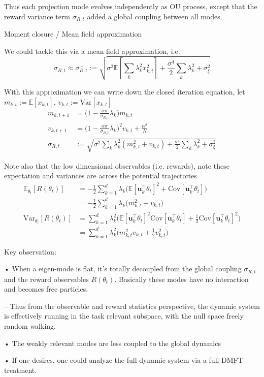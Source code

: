 Thus each projection mode evolves independently as OU process, except that the reward variance term $\sigma_{R,t}$ added a global coupling between all modes.

Moment closure / Mean field approximation

We could tackle this via a mean field approximation, i.e.
\begin{equation}
\sigma_{R,t}\approx\bar{\sigma_{R,t}}:=\sqrt{\sigma^{2}\mathbb{E}[\sum_{k}\lambda_{k}^{2}x_{k,t}^{2}]+\frac{\sigma^{4}}{2}\sum_{k}\lambda_{k}^{2}+\sigma_{\xi}^{2}}
\end{equation}

With this approximation we can write down the closed iteration equation, let $m_{k,t}:=\mathbb{E}[x_{k,t}]$, $v_{k,t}:=\mathrm{Var}[x_{k,t}]$
\begin{align}
m_{k,t+1}	&=\big(1-\frac{\alpha\sigma}{\bar{\sigma}_{R,t}}\lambda_{k}\big)m_{k,t} \\
v_{k,t+1}	&=\big(1-\frac{\alpha\sigma}{\bar{\sigma}_{R,t}}\lambda_{k}\big)^{2}v_{k,t}+\frac{\alpha^{2}}{N} \\
\bar{\sigma}_{R,t}	&:=\sqrt{\sigma^{2}\sum_{k}\lambda_{k}^{2}(m_{k,t}^{2}+v_{k,t})+\frac{\sigma^{4}}{2}\sum_{k}\lambda_{k}^{2}+\sigma_{\xi}^{2}}
\end{align}

Note also that the low dimensional observables (i.e. rewards), note these expectation and variances are across the potential trajectories
\begin{align}
\mathbb{E}_{\theta_{t}}[R(\theta_{t})]	&=-\frac{1}{2}\sum_{k=1}^{d}\lambda_{k}\Big(\mathbb{E}[\mathbf{u}_{k}^{\top}\theta_{t}]^{2}+\mathrm{Cov}[\mathbf{u}_{k}^{\top}\theta_{t}]\Big) \\
	&=-\frac{1}{2}\sum_{k=1}^{d}\lambda_{k}\Big(m_{k,t}^{2}+v_{k,t}\Big) \\
\mathrm{Var}_{\theta_{t}}[R(\theta_{t})]	&=\sum_{k=1}^{d}\lambda_{k}^{2}\Big(\mathbb{E}[\mathbf{u}_{k}^{\top}\theta_{t}]^{2}\mathrm{Cov}[\mathbf{u}_{k}^{\top}\theta_{t}]+\frac{1}{2}\mathrm{Cov}[\mathbf{u}_{k}^{\top}\theta_{t}]^{2}\Big) \\
	&=\sum_{k=1}^{d}\lambda_{k}^{2}\Big(m_{k,t}^{2}v_{k,t}+\frac{1}{2}v_{k,t}^{2}\Big)
\end{align}

Key observation:

• When a eigen-mode is flat, it's totally decoupled from the global coupling $\sigma_{R,t}$ and the reward observables $R(\theta_{t})$. Basically these modes have no interaction and becomes free particles.

– Thus from the observable and reward statistics perspective, the dynamic system is effectively running in the task relevant subspace, with the null space freely random walking.

• The weakly relevant modes are less coupled to the global dynamics

• If one desires, one could analyze the full dynamic system via a full DMFT treatment.
